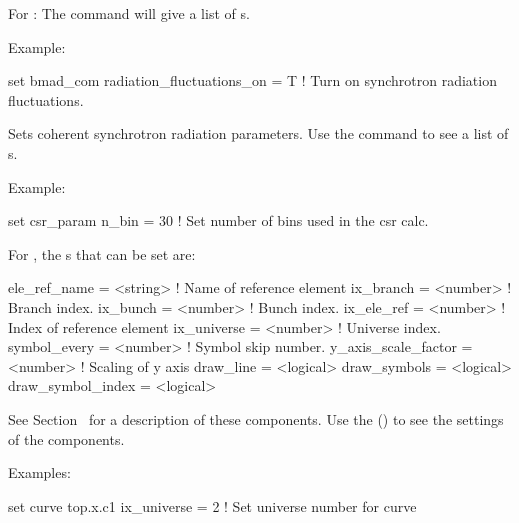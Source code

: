 {{\begin{description}
For : The  command will give a list of 
s.

Example:
\begin{example}
  set bmad_com radiation_fluctuations_on = T ! Turn on synchrotron radiation fluctuations.
\end{example}


\item[set csr_param <component> = <value>] \Newline

\vskip -0.2in

Sets coherent synchrotron radiation parameters. Use the  command to see a list of s.

Example:
\begin{example}
  set csr_param n_bin = 30  ! Set number of bins used in the csr calc.
\end{example}


\item[set curve <curve> <component> = <value>] \Newline

\vskip -0.2in

For , the s that can be set are:
\begin{example}
  ele_ref_name        = <string>  ! Name of reference element
  ix_branch           = <number>  ! Branch index.
  ix_bunch            = <number>  ! Bunch index.
  ix_ele_ref          = <number>  ! Index of reference element
  ix_universe         = <number>  ! Universe index.
  symbol_every        = <number>  ! Symbol skip number.
  y_axis_scale_factor = <number>  ! Scaling of y axis
  draw_line           = <logical> 
  draw_symbols        = <logical> 
  draw_symbol_index   = <logical> 
\end{example}
See Section~ for a description of these components.
Use the  () to see the settings of the
components.

Examples:
\begin{example}
  set curve top.x.c1 ix_universe = 2  ! Set universe number for curve
\end{example}



\end{description}}}
